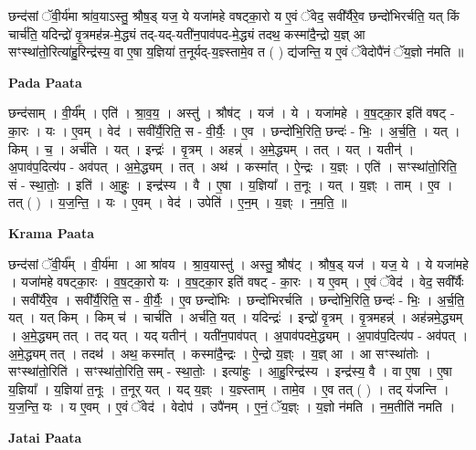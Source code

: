 \documentclass[17pt]{extarticle}
\begin{document}
छन्द॑सां ॅवी॒र्य॑मा श्रा॑व॒याऽस्तु॒ श्रौष॒ड् यज॒ ये यजा॑महे वषट्का॒रो य ए॒वं ॅवेद॒ सवी᳚र्यैरे॒व छन्दो॑भिरर्चति॒ यत् किं चार्च॑ति॒ यदिन्द्रो॑ वृ॒त्रमह॑न्न-मे॒द्ध्यं तद्-यद्-यती॑न॒पाव॑पद-मे॒द्ध्यं तदथ॒ कस्मा॑दै॒न्द्रो य॒ज्ञ् आ सꣳस्था॑तो॒रित्या॑हु॒रिन्द्र॑स्य॒ वा ए॒षा य॒ज्ञिया॑ त॒नूर्यद्-य॒ज्ञ्स्तामे॒व त ( ) द्य॑जन्ति॒ य ए॒वं ॅवेदोपै॑नं ॅय॒ज्ञो न॑मति ॥ \newline

\textbf{Pada Paata} \newline

छन्द॑साम् । वी॒र्य᳚म् । एति॑ । श्रा॒व॒य॒ । अस्तु॑ । श्रौष॑ट् । यज॑ । ये । यजा॑महे । व॒ष॒ट्का॒र इति॑ वषट् - का॒रः । यः । ए॒वम् । वेद॑ । सवी᳚र्यै॒रिति॒ स - वी॒र्यैः॒ । ए॒व । छन्दो॑भि॒रिति॒ छन्दः॑ - भिः॒ । अ॒र्च॒ति॒ । यत् । किम् । च॒ । अर्च॑ति । यत् । इन्द्रः॑ । वृ॒त्रम् । अहन्न्॑ । अ॒मे॒द्ध्यम् । तत् । यत् । यतीन्॑ । अ॒पाव॑प॒दित्य॑प - अव॑पत् । अ॒मे॒द्ध्यम् । तत् । अथ॑ । कस्मा᳚त् । ऐ॒न्द्रः । य॒ज्ञ्ः । एति॑ । सꣳस्था॑तो॒रिति॒ सं - स्था॒तोः॒ । इति॑ । आ॒हुः॒ । इन्द्र॑स्य । वै । ए॒षा । य॒ज्ञिया᳚ । त॒नूः । यत् । य॒ज्ञ्ः । ताम् । ए॒व । तत् ( ) । य॒ज॒न्ति॒ । यः । ए॒वम् । वेद॑ । उपेति॑ । ए॒न॒म् । य॒ज्ञ्ः । न॒म॒ति॒ ॥  \newline


\textbf{Krama Paata} \newline

छन्द॑सां ॅवी॒र्य᳚म् । वी॒र्य॑मा । आ श्रा॑वय । श्रा॒व॒यास्तु॑ । अस्तु॒ श्रौष॑ट् । श्रौष॒ड् यज॑ । यज॒ ये । ये यजा॑महे । यजा॑महे वषट्का॒रः । व॒ष॒ट्का॒रो यः । व॒ष॒ट्का॒र इति॑ वषट् - का॒रः । य ए॒वम् । ए॒वं ॅवेद॑ । वेद॒ सवी᳚र्यैः । सवी᳚र्यैरे॒व । सवी᳚र्यै॒रिति॒ स - वी॒र्यैः॒ । ए॒व छन्दो॑भिः । छन्दो॑भिरर्चति । छन्दो॑भि॒रिति॒ छन्दः॑ - भिः॒ । अ॒र्च॒ति॒ यत् । यत् किम् । किम् च॑ । चार्च॑ति । अर्च॑ति॒ यत् । यदिन्द्रः॑ । इन्द्रो॑ वृ॒त्रम् । वृ॒त्रमहन्न्॑ । अह॑न्नमे॒द्ध्यम् । अ॒मे॒द्ध्यम् तत् । तद् यत् । यद् यतीन्॑ । यती॑न॒पाव॑पत् । अ॒पाव॑पदमे॒द्ध्यम् । अ॒पाव॑प॒दित्य॑प - अव॑पत् । अ॒मे॒द्ध्यम् तत् । तदथ॑ । अथ॒ कस्मा᳚त् । कस्मा॑दै॒न्द्रः । ऐ॒न्द्रो य॒ज्ञ्ः । य॒ज्ञ् आ । आ सꣳस्था॑तोः । सꣳस्था॑तो॒रिति॑ । सꣳस्था॑तो॒रिति॒ सम् - स्था॒तोः॒ । इत्या॑हुः । आ॒हु॒रिन्द्र॑स्य । इन्द्र॑स्य॒ वै । वा ए॒षा । ए॒षा य॒ज्ञिया᳚ । य॒ज्ञिया॑ त॒नूः । त॒नूर् यत् । यद् य॒ज्ञ्ः । य॒ज्ञ्स्ताम् । तामे॒व । ए॒व तत् ( ) । तद् य॑जन्ति । य॒ज॒न्ति॒ यः । य ए॒वम् । ए॒वं ॅवेद॑ । वेदोप॑ । उपै॑नम् । ए॒नं॒ ॅय॒ज्ञ्ः । य॒ज्ञो न॑मति । न॒म॒तीति॑ नमति । \newline

\textbf{Jatai Paata} \newline
\end{document}

